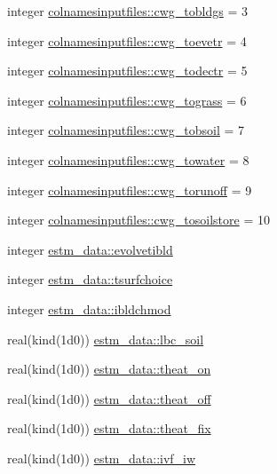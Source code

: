 \begin{DoxyCompactItemize}
integer \hyperlink{namespacecolnamesinputfiles_ae40f13debc20fc4d369d7be6089d29fe}{colnamesinputfiles\+::cwg\+\_\+tobldgs} = 3
\item 
integer \hyperlink{namespacecolnamesinputfiles_adef6bd71d6aaf94c2fbcfd4759cd10cc}{colnamesinputfiles\+::cwg\+\_\+toevetr} = 4
\item 
integer \hyperlink{namespacecolnamesinputfiles_a078d0b487d6d85f408d287eaaafad86e}{colnamesinputfiles\+::cwg\+\_\+todectr} = 5
\item 
integer \hyperlink{namespacecolnamesinputfiles_a26de107a7c31bec02c878c95fa12afaf}{colnamesinputfiles\+::cwg\+\_\+tograss} = 6
\item 
integer \hyperlink{namespacecolnamesinputfiles_ad640d67e5e4caa9de24c0a8f1dd14823}{colnamesinputfiles\+::cwg\+\_\+tobsoil} = 7
\item 
integer \hyperlink{namespacecolnamesinputfiles_a5d8e3bc52b4085fc02c87b72863097fc}{colnamesinputfiles\+::cwg\+\_\+towater} = 8
\item 
integer \hyperlink{namespacecolnamesinputfiles_acc2373562aba09ce4159c84e13cffde9}{colnamesinputfiles\+::cwg\+\_\+torunoff} = 9
\item 
integer \hyperlink{namespacecolnamesinputfiles_a00e15e85f40dc69c021c7686e37a496a}{colnamesinputfiles\+::cwg\+\_\+tosoilstore} = 10
\item 
integer \hyperlink{namespaceestm__data_acff108926dd55ed2574e3a777fa82e03}{estm\+\_\+data\+::evolvetibld}
\item 
integer \hyperlink{namespaceestm__data_a006f7851647528d67a1663c4287987cb}{estm\+\_\+data\+::tsurfchoice}
\item 
integer \hyperlink{namespaceestm__data_acd010aa38e7e7891adb7711cc5b5944b}{estm\+\_\+data\+::ibldchmod}
\item 
real(kind(1d0)) \hyperlink{namespaceestm__data_a0bedfac15a2049f97e8e052918bdcf5a}{estm\+\_\+data\+::lbc\+\_\+soil}
\item 
real(kind(1d0)) \hyperlink{namespaceestm__data_afbff94a2d61692610e6181c1a557b1b6}{estm\+\_\+data\+::theat\+\_\+on}
\item 
real(kind(1d0)) \hyperlink{namespaceestm__data_a20d9fef092d33c94a656983052f17b8d}{estm\+\_\+data\+::theat\+\_\+off}
\item 
real(kind(1d0)) \hyperlink{namespaceestm__data_a0c35cb0c35299e4396912d865e3f8e99}{estm\+\_\+data\+::theat\+\_\+fix}
\item 
real(kind(1d0)) \hyperlink{namespaceestm__data_ace7c6cd6fc62d3dad2691279b6f7569c}{estm\+\_\+data\+::ivf\+\_\+iw}

\end{DoxyCompactItemize}
